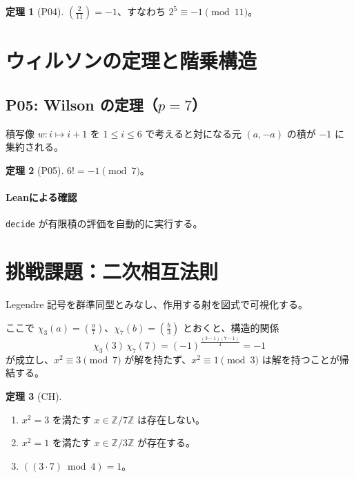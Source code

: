\documentclass{ltjsarticle}
\theoremstyle{definition}
\newtheorem{theorem}{定理}[section]
\begin{document}
\begin{theorem}[P04]
$\left(\frac{2}{11}\right)=-1$、すなわち $2^5 \equiv -1 \pmod{11}$。
\end{theorem}

\section{ウィルソンの定理と階乗構造}
\subsection{P05: Wilson の定理（$p=7$）}
積写像 $w: i \mapsto i+1$ を $1\leq i \leq 6$ で考えると対になる元 $(a, -a)$ の積が $-1$ に集約される。

\begin{theorem}[P05]
$6! = -1 \pmod 7$。
\end{theorem}

\paragraph{Leanによる確認} \verb|decide| が有限積の評価を自動的に実行する。

\section{挑戦課題：二次相互法則}
Legendre 記号を群準同型とみなし、作用する射を図式で可視化する。

\begin{center}
\end{center}

ここで $\chi_3(a) = \left(\frac{a}{7}\right)$、$\chi_7(b) = \left(\frac{b}{3}\right)$ とおくと、構造的関係
\[
\chi_3(3)\,\chi_7(7) = (-1)^{\frac{(3-1)(7-1)}{4}} = -1
\]
が成立し、$x^2 \equiv 3 \pmod 7$ が解を持たず、$x^2 \equiv 1 \pmod 3$ は解を持つことが帰結する。

\begin{theorem}[CH]
\begin{enumerate}[label=\textnormal{(\roman*)}]
  \item $x^2=3$ を満たす $x \in \mathbb{Z}/7\mathbb{Z}$ は存在しない。
  \item $x^2=1$ を満たす $x \in \mathbb{Z}/3\mathbb{Z}$ が存在する。
  \item $((3\cdot7) \bmod 4) = 1$。
\end{enumerate}
\end{theorem}
\end{document}
